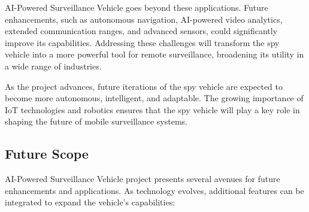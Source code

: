\documentclass[12pt,a4paper]{report}
\begin{document}
AI-Powered Surveillance Vehicle goes beyond these applications. Future enhancements, such as autonomous navigation, AI-powered video analytics, extended communication ranges, and advanced sensors, could significantly improve its capabilities. Addressing these challenges will transform the spy vehicle into a more powerful tool for remote surveillance, broadening its utility in a wide range of industries.

As the project advances, future iterations of the spy vehicle are expected to become more autonomous, intelligent, and adaptable. The growing importance of IoT technologies and robotics ensures that the spy vehicle will play a key role in shaping the future of mobile surveillance systems.


\label{Future Scope}
\subsection{Future Scope}
AI-Powered Surveillance Vehicle project presents several avenues for future enhancements and applications. As technology evolves, additional features can be integrated to expand the vehicle's capabilities:
\end{document}
